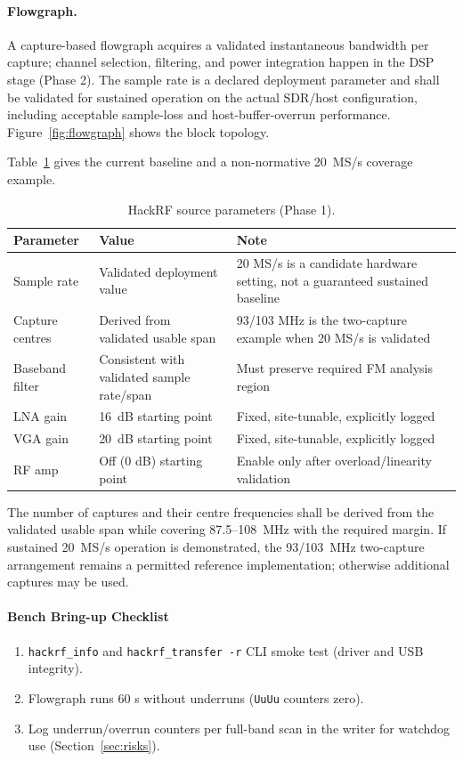 \documentclass[12pt,a4paper]{report}
\begin{document}
 \paragraph*{Flowgraph.}
 A capture-based flowgraph acquires a validated instantaneous bandwidth per capture; channel selection, filtering, and power integration happen in the DSP stage (Phase 2). The sample rate is a declared deployment parameter and shall be validated for sustained operation on the actual SDR/host configuration, including acceptable sample-loss and host-buffer-overrun performance. Figure~\ref{fig:flowgraph} shows the block topology.

Table~\ref{tab:srcparams} gives the current baseline and a non-normative 20~MS/s coverage example.
 \begin{table}[htbp]
 	\centering
 	\caption{HackRF source parameters (Phase 1).}
 	\label{tab:srcparams}
 	\begin{tabular}{@{}lll@{}}
 		\toprule
 		\textbf{Parameter} & \textbf{Value} & \textbf{Note} \\
 		\midrule
 		Sample rate & Validated deployment value & 20 MS/s is a candidate hardware setting, not a guaranteed sustained baseline \\
 		Capture centres & Derived from validated usable span & 93/103 MHz is the two-capture example when 20 MS/s is validated \\
 		Baseband filter & Consistent with validated sample rate/span & Must preserve required FM analysis region \\
 		LNA gain & \SI{16}{dB} starting point & Fixed, site-tunable, explicitly logged \\
 		VGA gain & \SI{20}{dB} starting point & Fixed, site-tunable, explicitly logged \\
 		RF amp & Off (0 dB) starting point & Enable only after overload/linearity validation \\
 		\bottomrule
 	\end{tabular}
 \end{table}
 The number of captures and their centre frequencies shall be derived from the validated usable span while covering 87.5--108~MHz with the required margin. If sustained 20~MS/s operation is demonstrated, the 93/103~MHz two-capture arrangement remains a permitted reference implementation; otherwise additional captures may be used.
 \paragraph*{Bench Bring-up Checklist}
 \begin{enumerate}
 	\item \texttt{hackrf\_info} and \texttt{hackrf\_transfer -r} CLI smoke test
 	(driver and USB integrity).
 	\item Flowgraph runs 60 s without underruns (\texttt{UuUu} counters zero).
 	\item Log underrun/overrun counters per full-band scan in the writer for
 	watchdog use (Section~\ref{sec:risks}).
 \end{enumerate}
\end{document}
